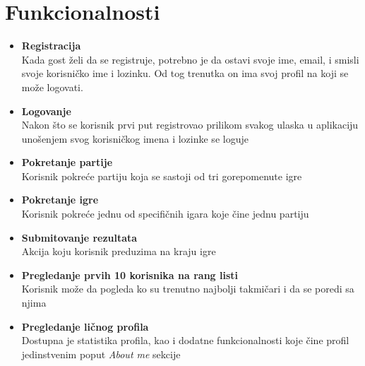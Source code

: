 \documentclass{article}
\begin{document}
\section{Funkcionalnosti}
\begin{itemize}
    \item \textbf{Registracija} \\
    Kada gost želi da se registruje, potrebno je da ostavi svoje ime, email, i smisli svoje 
korisničko ime i lozinku. Od tog trenutka on ima svoj profil na koji se može logovati.
    \item \textbf{Logovanje} \\
    Nakon što se korisnik prvi put registrovao prilikom svakog ulaska u aplikaciju unošenjem 
svog korisničkog imena i lozinke se loguje
    \item \textbf{Pokretanje partije} \\
    Korisnik pokreće partiju koja se sastoji od tri gorepomenute igre

    \item \textbf{Pokretanje igre} \\
    Korisnik pokreće jednu od specifičnih igara koje čine jednu partiju

    \item \textbf{Submitovanje rezultata} \\
    Akcija koju korisnik preduzima na kraju igre
    \item \textbf{Pregledanje prvih 10 korisnika na rang listi} \\
    Korisnik može da pogleda ko su trenutno najbolji takmičari i da se poredi sa njima
    \item \textbf{Pregledanje ličnog profila} \\
    Dostupna je statistika profila, kao i dodatne funkcionalnosti koje čine profil jedinstvenim 
poput \textit{About me} sekcije
\end{itemize}
\end{document}
